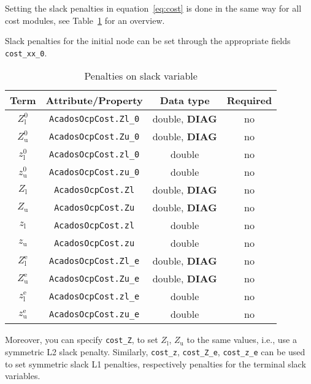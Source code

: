 \documentclass[english]{article}
\newcommand{\code}[1]{\texttt{#1}}
\newcommand{\ind}[1]{_{\textrm{#1}}}
\newcommand{\terminal}{^{\textrm{e}}}
\newcommand{\initial}{^{\textrm{0}}}
\newcommand{\Lower}{\ind{l}}
\newcommand{\upper}{\ind{u}}
\newcommand{\optional}{no}
\begin{document}
Setting the slack penalties in equation~\eqref{eq:cost} is done in the same way for all cost modules, see Table~\ref{tab:cost:slack} for an overview.

Slack penalties for the initial node can be set through the appropriate fields \code{cost\_xx\_0}.
%
\begin{table}[h!]
    \centering
    \begin{tabular}{cccc}
        \toprule
        Term  & Attribute/Property & Data type & Required \\ \midrule
        $ Z\Lower\initial $ & \code{AcadosOcpCost.Zl\_0} & double, \textbf{DIAG} & \optional   \\[3pt]
        $ Z\upper\initial $ & \code{AcadosOcpCost.Zu\_0} & double, \textbf{DIAG} & \optional   \\[3pt]
        $ z\Lower\initial $ & \code{AcadosOcpCost.zl\_0} & double  & \optional   \\[3pt]
        $ z\upper\initial $ & \code{AcadosOcpCost.zu\_0} & double  & \optional   \\[10pt]
        $ Z\Lower $          & \code{AcadosOcpCost.Zl}    & double, \textbf{DIAG}  & \optional \\[3pt]
        $ Z\upper $          & \code{AcadosOcpCost.Zu}    & double, \textbf{DIAG}  & \optional   \\[3pt]
        $ z\Lower $          & \code{AcadosOcpCost.zl}    & double  & \optional   \\[3pt]
        $ z\upper $          & \code{AcadosOcpCost.zu}    & double  & \optional   \\[10pt]
        $ Z\Lower\terminal $ & \code{AcadosOcpCost.Zl\_e} & double, \textbf{DIAG} & \optional   \\[3pt]
        $ Z\upper\terminal $ & \code{AcadosOcpCost.Zu\_e} & double, \textbf{DIAG} & \optional   \\[3pt]
        $ z\Lower\terminal $ & \code{AcadosOcpCost.zl\_e} & double  & \optional   \\[3pt]
        $ z\upper\terminal $ & \code{AcadosOcpCost.zu\_e} & double  & \optional   \\[3pt]
        \bottomrule
    \end{tabular}
    \caption{Penalties on slack variable} \label{tab:cost:slack}
\end{table}

Moreover, you can specify \code{cost\_Z}, to set $ Z\Lower$, $Z\upper$ to the same values, i.e., use a symmetric L2 slack penalty.
Similarly, \code{cost\_z}, \code{cost\_Z\_e}, \code{cost\_z\_e} can be used to set symmetric slack L1 penalties, respectively penalties for the terminal slack variables.
\end{document}
